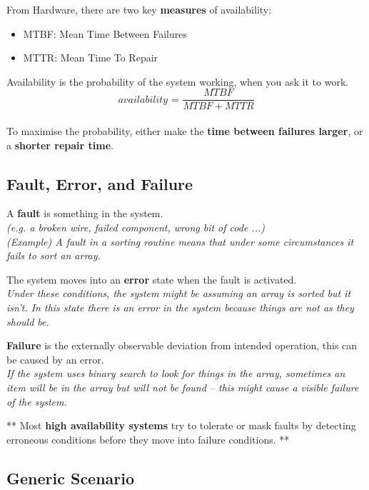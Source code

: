 \documentclass[a4paper]{article}
\begin{document}
From Hardware, there are two key \textbf{measures} of availability:
\begin{itemize}
\item{MTBF: Mean Time Between Failures}
\item{MTTR: Mean Time To Repair}\\
\end{itemize}
Availability is the probability of the system working, when you ask it to work.\\

$$\textit{availability = }\frac{MTBF}{MTBF+MTTR}$$\\

To maximise the probability, either make the \textbf{time between failures larger}, or a \textbf{shorter repair time}.
\newline
\subsection{Fault, Error, and Failure}
A \textbf{fault} is something in the system.\\
\textit{(e.g. a broken wire, failed component, wrong bit of code ...)}\\
\textit{(Example) A fault in a sorting routine means that under some circumstances it fails to sort an array.}

The system moves into an \textbf{error} state when the fault is activated.\\
\textit{Under these conditions, the system might be assuming an array is sorted but it isn’t.  In this state there is an error in the system because things are not as they should be.}

\textbf{Failure} is the externally observable deviation from intended operation, this can be caused by an error.\\
\textit{If the system uses binary search to look for things in the array, sometimes an item will be in the array but will not be found – this might cause a visible failure  of the system.}


** Most \textbf{high availability systems} try to tolerate or mask faults by detecting erroneous conditions before they move into failure conditions. **


\subsection{Generic Scenario}
\end{document}
